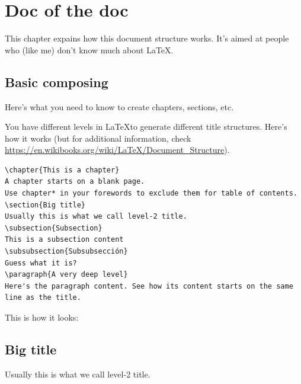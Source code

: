\chapter{Doc of the doc}
\label{autodoc}

This chapter expains how this document structure works.
It's aimed at people who (like me) don't know much about \LaTeX.

\section{Basic composing}

Here's what you need to know to create chapters, sections, etc.

You have different levels in \LaTeX to generate different title structures. Here's how it works (but for additional information, check \url{https://en.wikibooks.org/wiki/LaTeX/Document_Structure}).

\begin{lstlisting}[style=Latex-color]
\chapter{This is a chapter}
A chapter starts on a blank page.
Use chapter* in your forewords to exclude them for table of contents.
\section{Big title}
Usually this is what we call level-2 title.
\subsection{Subsection}
This is a subsection content
\subsubsection{Subsubsección}
Guess what it is?
\paragraph{A very deep level}
Here's the paragraph content. See how its content starts on the same line as the title.
\end{lstlisting}
This is how it looks:
    \section{Big title}
    Usually this is what we call level-2 title.
